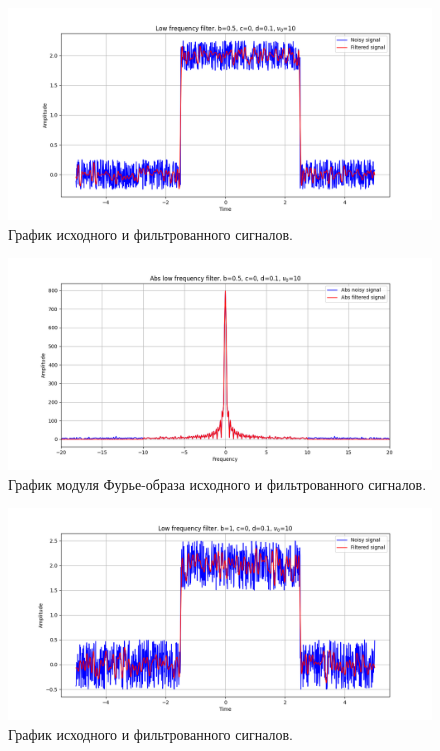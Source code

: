 \documentclass[a4paper, 12pt]{article}
\begin{document}
    \begin{figure}[!htb]
        \centering
        \includegraphics[scale=0.485]{1_u_flt_u_nohigh.png}
        \captionsetup{skip=0pt}
        \caption{График исходного и фильтрованного сигналов.}
        \label{fig:fig1}
    \end{figure}
    \begin{figure}[!htb]
        \centering
        \includegraphics[scale=0.485]{1_abs_u_U_nohigh.png}
        \captionsetup{skip=0pt}
        \caption{График модуля Фурье-образа исходного и фильтрованного сигналов.}
        \label{fig:fig2}
    \end{figure}
    \begin{figure}[!htb]
        \centering
        \includegraphics[scale=0.485]{2_u_flt_u_nohigh.png}
        \captionsetup{skip=0pt}
        \caption{График исходного и фильтрованного сигналов.}
        \label{fig:fig3}
    \end{figure}
\end{document}
